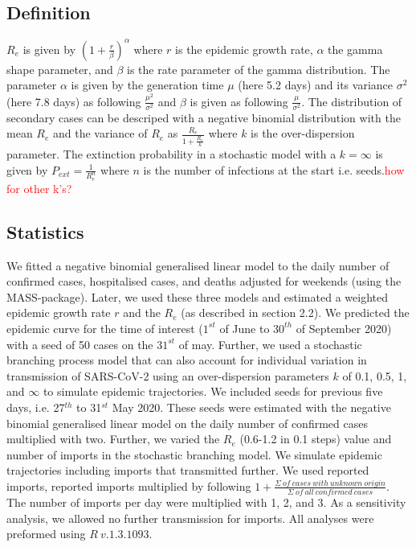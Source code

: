 \documentclass[10pt, a4paper, twoside]{article}
\begin{document}
\begin{multicols}{2}
\subsection{Definition}
$R_e$ is given by $(1 + \frac{r}{\beta} )^\alpha$ where $r$ is the epidemic growth rate, $\alpha$ the gamma shape parameter, and $\beta$ is the rate parameter of the gamma distribution. 
The parameter $\alpha$ is given by the generation time $\mu$ (here 5.2 days) and its variance $\sigma^2$ (here 7.8 days) as following $\frac{\mu^2}{\sigma^2 }$ and $\beta$ is given as following $\frac{\mu}{\sigma^2}$. 
The distribution of secondary cases can be descriped with a negative binomial distribution with the mean $R_e$ and the variance of $R_e$ as $\frac{R_e}{1+\frac{R_e}{k}}$ where $k$ is the over-dispersion parameter. 
The extinction probability in a stochastic model with a $k = \infty$ is given by $ P_{ext} = \frac{1}{R_e^n}$ where $n$ is the number of infections at the start i.e. seeds.\textcolor{red}{how for other k's?}

\subsection{Statistics}
We fitted a negative binomial generalised linear model to the daily number of confirmed cases, hospitalised cases, and deaths adjusted for weekends (using the MASS-package).\cite{venables_modern_2002} 
Later, we used these three models and estimated a weighted epidemic growth rate $r$ and the $R_e$ (as described in section 2.2). 
We predicted the epidemic curve for the time of interest ($1^{st}$ of June to $30^{th}$ of September 2020) with a seed of 50 cases on the $31^{st}$ of may. 
Further, we used a stochastic branching process model that can also account for individual variation in transmission of SARS-CoV-2 using an over-dispersion parameters $k$ of 0.1, 0.5, 1, and  $\infty$ to simulate epidemic trajectories. 
We included seeds for previous five days, i.e. 27$^{th}$  to 31$^{st}$ May 2020.
These seeds were estimated with the negative binomial generalised linear model on the daily number of confirmed cases multiplied with two. 
Further, we varied the $R_e$ (0.6-1.2 in 0.1 steps) value and number of imports in the stochastic branching model. 
We simulate epidemic trajectories including imports that transmitted further. 
We used reported imports, reported imports multiplied by following $1+ \frac{\Sigma ~of ~cases ~with ~unknown ~origin }{\Sigma ~of ~all ~confirmed ~cases}$. 
The number of imports per day were multiplied with 1, 2, and 3. As a sensitivity analysis, we allowed no further transmission for imports. 
All analyses were preformed using $R ~v.1.3.1093$.\cite{r_core_team_r_2020}



\end{multicols}
\end{document}
